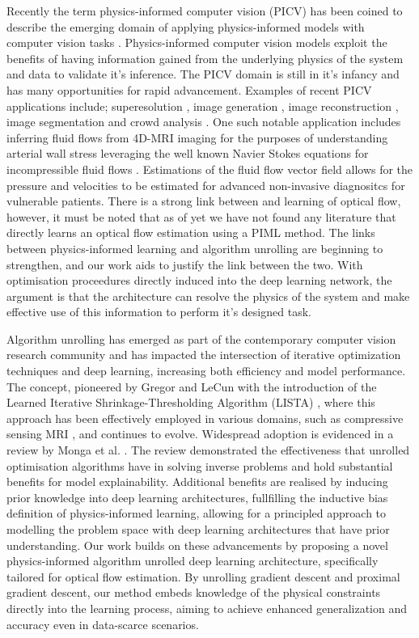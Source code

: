 \IEEEPARstart{}{} Recently the term physics-informed computer vision (PICV) has been coined to describe the emerging domain of applying physics-informed models with computer vision tasks \cite{banerjee2023physics}. Physics-informed computer vision models exploit the benefits of having information gained from the underlying physics of the system and data to validate it's inference. The PICV domain is still in it's infancy and has many opportunities for rapid advancement. Examples of recent PICV applications include; superesolution \cite{arora2022spatio}, image generation \cite{zheng2020physics}, image reconstruction \cite{chu2022physics}, image segmentation \cite{jenkins2020physics, cciccek20163d} and crowd analysis \cite{behera2021pidlnet}. One such notable application includes inferring fluid flows from 4D-MRI imaging for the purposes of understanding arterial wall stress leveraging the well known Navier Stokes equations for incompressible fluid flows \cite{raissi2020hidden}. Estimations of the fluid flow vector field allows for the pressure and velocities to be estimated for advanced non-invasive diagnositcs for vulnerable patients. There is a strong link between \cite{raissi2020hidden} and learning of optical flow, however, it must be noted that as of yet we have not found any literature that directly learns an optical flow estimation using a PIML method. The links between physics-informed learning and algorithm unrolling are beginning to strengthen, and our work aids to justify the link between the two. With optimisation proceedures directly induced into the deep learning network, the argument is that the architecture can resolve the physics of the system and make effective use of this information to perform it's designed task.

\IEEEPARstart{}{} Algorithm unrolling has emerged as part of the contemporary computer vision research community and has impacted the intersection of iterative optimization techniques and deep learning, increasing both efficiency and model performance. The concept, pioneered by Gregor and LeCun with the introduction of the Learned Iterative Shrinkage-Thresholding Algorithm (LISTA) \cite{gregor2010learning}, where this approach has been effectively employed in various domains, such as compressive sensing MRI \cite{yang2016deep}, and continues to evolve. Widespread adoption is evidenced in a review by Monga et al. \cite{monga2021algorithm}. The review demonstrated the effectiveness that unrolled optimisation algorithms have in solving inverse problems and hold substantial benefits for model explainability. Additional benefits are realised by inducing prior knowledge into deep learning architectures, fullfilling the inductive bias definition of physics-informed learning, allowing for a principled approach to modelling the problem space with deep learning architectures that have prior understanding. Our work builds on these advancements by proposing a novel physics-informed algorithm unrolled deep learning architecture, specifically tailored for optical flow estimation. By unrolling gradient descent and proximal gradient descent, our method embeds knowledge of the physical constraints directly into the learning process, aiming to achieve enhanced generalization and accuracy even in data-scarce scenarios.

